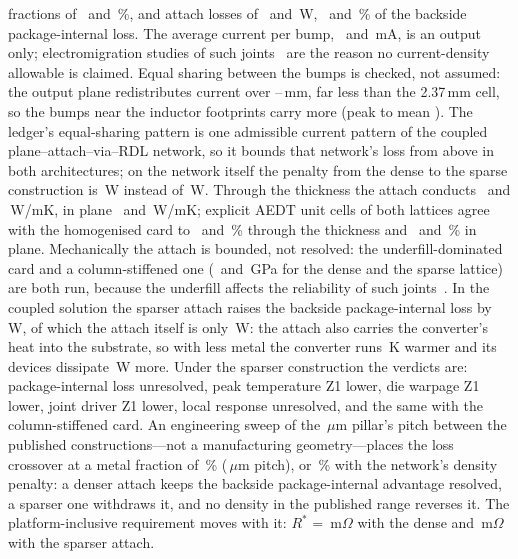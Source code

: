 \documentclass[journal]{IEEEtran}
\begin{document}
fractions of \AttDenseFpct\ and \AttSparseFpct\,\%, and attach losses of \AttDensePw\ and \AttSparsePw\,W, \AttDenseFracPct\ and \AttSparseFracPct\,\% of the backside package-internal loss. The average current per bump, \AttDenseImA\ and \AttSparseImA\,mA, is an output only; electromigration studies of such joints~\cite{Hsiao2015CuPillarEM,Fu2023CuPillarEM} are the reason no current-density allowable is claimed. Equal sharing between the bumps is checked, not assumed: the output plane redistributes current over \AttDenseLambda--\AttSparseLambda\,mm, far less than the 2.37\,mm cell, so the bumps near the inductor footprints carry more (peak to mean \AttPeakMean). The ledger's equal-sharing pattern is one admissible current pattern of the coupled plane--attach--via--RDL network, so it bounds that network's loss from above in both architectures; on the network itself the penalty from the dense to the sparse construction is \AttPenNet\,W instead of \AttPenBlock\,W. Through the thickness the attach conducts \AttDenseKz\ and \AttSparseKz\,W/mK, in plane \AttDenseKxy\ and \AttSparseKxy\,W/mK; explicit AEDT unit cells of both lattices agree with the homogenised card to \ErrAttDenseKz\ and \ErrAttSparseKz\,\% through the thickness and \ErrAttDenseKxy\ and \ErrAttSparseKxy\,\% in plane. Mechanically the attach is bounded, not resolved: the underfill-dominated card and a column-stiffened one (\AttDenseEB\ and \AttSparseEB\,GPa for the dense and the sparse lattice) are both run, because the underfill affects the reliability of such joints~\cite{Lee2017WaferLevelUnderfill}. In the coupled solution the sparser attach raises the backside package-internal loss by \AttDeltaPetm\,W, of which the attach itself is only \AttDeltaPatt\,W: the attach also carries the converter's heat into the substrate, so with less metal the converter runs \AttDeltaTconv\,K warmer and its devices dissipate \AttDeltaPconv\,W more. Under the sparser construction the verdicts are: package-internal loss unresolved, peak temperature Z1 lower, die warpage Z1 lower, joint driver Z1 lower, local response unresolved, and the same with the column-stiffened card. An engineering sweep of the \AttDenseD\,$\mu$m pillar's pitch between the published constructions---not a manufacturing geometry---places the loss crossover at a metal fraction of \AttFstarPct\,\% (\AttPstar\,$\mu$m pitch), or \AttFstarNetPct\,\% with the network's density penalty: a denser attach keeps the backside package-internal advantage resolved, a sparser one withdraws it, and no density in the published range reverses it. The platform-inclusive requirement moves with it: $R^{*}$ = \RstarDenseSzero\,m$\Omega$ with the dense and \RstarSparseSzero\,m$\Omega$ with the sparser attach. 

\end{document}

